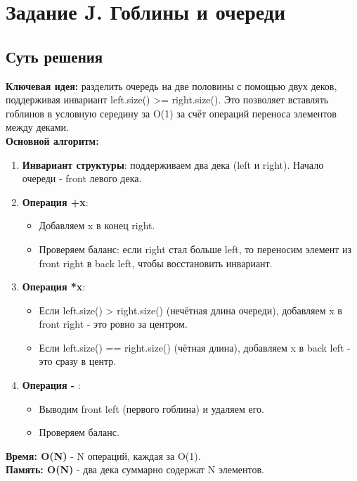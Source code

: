 \documentclass[a4paper,12pt]{article}
\begin{document}
    \newpage


    \section{Задание J. Гоблины и очереди}

    

    \subsection*{Суть решения}
    \textbf{Ключевая идея:} разделить очередь на две половины с помощью двух деков, поддерживая инвариант left.size() >= right.size(). Это позволяет вставлять гоблинов в условную середину за O(1) за счёт операций переноса элементов между деками.\\
    \textbf{Основной алгоритм:}
    \begin{enumerate}
        \item \textbf{Инвариант структуры}: поддерживаем два дека (left и right). Начало очереди - front левого дека.
        \item \textbf{Операция +x}:
        \begin{itemize}
            \item Добавляем x в конец right.
            \item Проверяем баланс: если right стал больше left, то переносим элемент из front right в back left, чтобы восстановить инвариант.
        \end{itemize}
        \item \textbf{Операция *x}:
        \begin{itemize}
            \item Если left.size() > right.size() (нечётная длина очереди), добавляем x в front right - это ровно за центром.
            \item Если left.size() == right.size() (чётная длина), добавляем x в back left - это сразу в центр.
        \end{itemize}
        \item \textbf{Операция - }:
        \begin{itemize}
            \item Выводим front left (первого гоблина) и удаляем его.
            \item Проверяем баланс.
        \end{itemize}
    \end{enumerate}
    \textbf{Время: O(N)} - N операций, каждая за O(1).\\
    \textbf{Память: O(N)} - два дека суммарно содержат N элементов.
\end{document}
